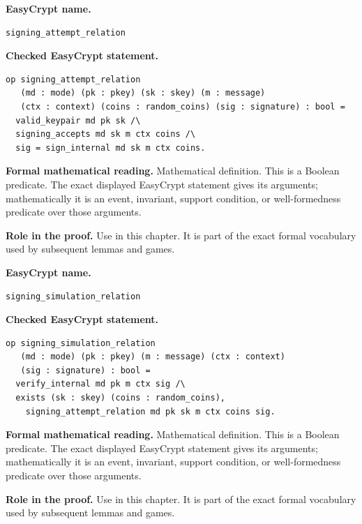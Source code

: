 \begin{formaldefinition}
\noindent\textbf{EasyCrypt name.}
\begin{lstlisting}[language=EasyCrypt,basicstyle=\ttfamily\scriptsize]
signing_attempt_relation
\end{lstlisting}
\noindent\textbf{Checked EasyCrypt statement.}
\begin{lstlisting}[language=EasyCrypt,basicstyle=\ttfamily\scriptsize]
op signing_attempt_relation
   (md : mode) (pk : pkey) (sk : skey) (m : message)
   (ctx : context) (coins : random_coins) (sig : signature) : bool =
  valid_keypair md pk sk /\
  signing_accepts md sk m ctx coins /\
  sig = sign_internal md sk m ctx coins.
\end{lstlisting}
\noindent\textbf{Formal mathematical reading.}
Mathematical definition. This is a Boolean predicate.  The exact displayed EasyCrypt statement gives its arguments; mathematically it is an event, invariant, support condition, or well-formedness predicate over those arguments.

\noindent\textbf{Role in the proof.}
Use in this chapter. It is part of the exact formal vocabulary used by subsequent lemmas and games.

\end{formaldefinition}

\begin{formaldefinition}
\noindent\textbf{EasyCrypt name.}
\begin{lstlisting}[language=EasyCrypt,basicstyle=\ttfamily\scriptsize]
signing_simulation_relation
\end{lstlisting}
\noindent\textbf{Checked EasyCrypt statement.}
\begin{lstlisting}[language=EasyCrypt,basicstyle=\ttfamily\scriptsize]
op signing_simulation_relation
   (md : mode) (pk : pkey) (m : message) (ctx : context)
   (sig : signature) : bool =
  verify_internal md pk m ctx sig /\
  exists (sk : skey) (coins : random_coins),
    signing_attempt_relation md pk sk m ctx coins sig.
\end{lstlisting}
\noindent\textbf{Formal mathematical reading.}
Mathematical definition. This is a Boolean predicate.  The exact displayed EasyCrypt statement gives its arguments; mathematically it is an event, invariant, support condition, or well-formedness predicate over those arguments.

\noindent\textbf{Role in the proof.}
Use in this chapter. It is part of the exact formal vocabulary used by subsequent lemmas and games.

\end{formaldefinition}

